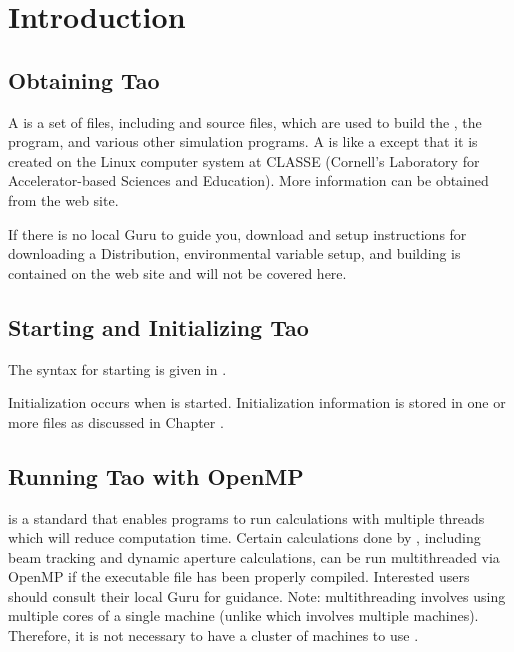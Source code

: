 \chapter{Introduction}
\label{c:introduction}

\section{Obtaining Tao}
\label{s:obtaining}

A  is a set of files, including \bmad and \tao source files, which are used to
build the \bmad, the \tao program, and various other simulation programs. A  is like a
 except that it is created on the Linux computer system at CLASSE (Cornell's
Laboratory for Accelerator-based Sciences and Education). More information can be obtained from the
\bmad web site. 

If there is no local \bmad Guru to guide you, download and setup instructions for downloading a
Distribution, environmental variable setup, and building \tao is contained on the \bmad web
site and will not be covered here.

\section{Starting and Initializing Tao}
\label{s:initializing}

The syntax for starting \tao is given in .

Initialization occurs when \tao is started. Initialization information is stored in one or more
files as discussed in Chapter .

\section{Running Tao with OpenMP}
\label{s:openmp}

 is a standard that enables programs to run calculations with multiple threads which will
reduce computation time. Certain calculations done by \tao, including beam tracking and dynamic
aperture calculations, can be run multithreaded via OpenMP if the \tao executable file has been
properly compiled.  Interested users should consult their local \bmad Guru for guidance. Note:
 multithreading involves using multiple cores of a single machine (unlike 
which involves multiple machines). Therefore, it is not necessary to have a cluster of machines to
use .

